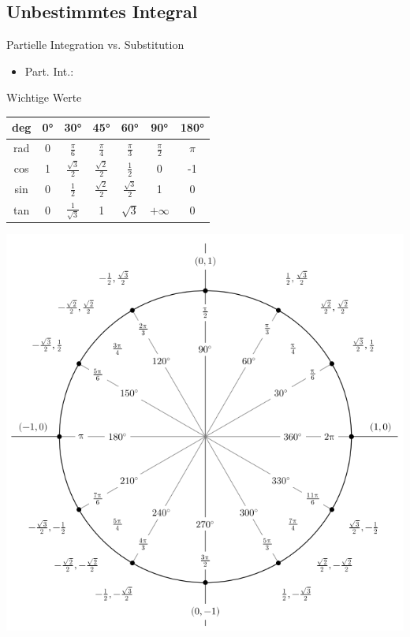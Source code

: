 \documentclass[a4paper,10pt]{article}
\begin{document}
\subsection{Unbestimmtes Integral}
\begin{defbox}
    {Partielle Integration vs. Substitution}
    \begin{itemize}
        \item Part. Int.: 
    \end{itemize}
\end{defbox}
\begin{tipbox}
{Wichtige Werte}
\begin{center} 
 \begin{tabular}{c|cccccc}
  deg & 0° & 30° & 45° & 60° & 90° & 180° \\
  \midrule
  rad & 0 & $\frac{\pi}{6}$ & $\frac{\pi}{4}$ & $\frac{\pi}{3}$ & $\frac{\pi}{2}$ & $\pi$ \\
  cos & 1 & $\frac{\sqrt{3}}{2}$ & $\frac{\sqrt{2}}{2}$ & $\frac{1}{2}$ & 0 & -1 \\
  sin & 0 & $\frac{1}{2}$ & $\frac{\sqrt{2}}{2}$ & $\frac{\sqrt{3}}{2}$ & 1 & 0 \\
  tan & 0 & $\frac{1}{\sqrt{3}}$ & 1 & $\sqrt{3}$ & $+\infty$ & 0 \\
 \end{tabular}
\end{center}
\end{tipbox}

\begin{center}
    \includegraphics[width=\linewidth]{unit_cirlce.png}
\end{center}
\end{document}
